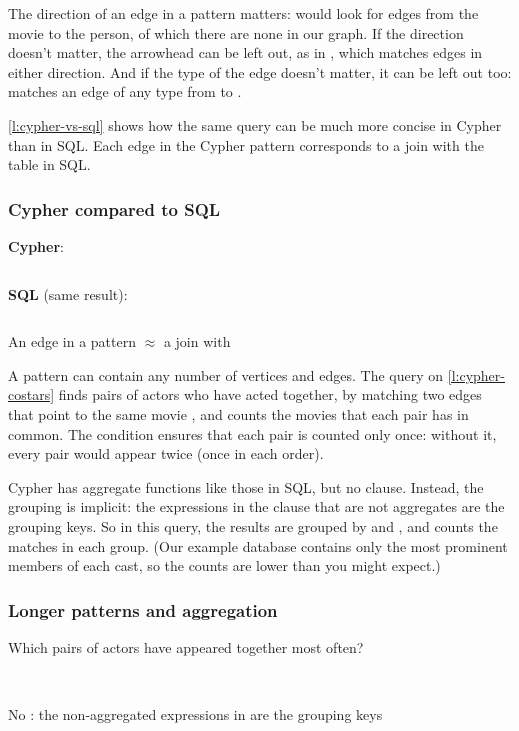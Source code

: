 The direction of an edge in a pattern matters:  would look for edges from the movie to the person, of which there are none in our graph.
If the direction doesn't matter, the arrowhead can be left out, as in , which matches edges in either direction.
And if the type of the edge doesn't matter, it can be left out too:  matches an edge of any type from  to .

\autoref{l:cypher-vs-sql} shows how the same query can be much more concise in Cypher than in SQL.
Each edge in the Cypher pattern corresponds to a join with the  table in SQL.

\begin{frame}
    \label{s:cypher-vs-sql}
    \frametitle{Cypher compared to SQL}
    \textbf{Cypher}:
    \inputminted[fontsize=\footnotesize]{cypher}{code/graph-directed-short.cypher}
    \vspace{0.6em}
    \textbf{SQL} (same result):
    \inputminted[fontsize=\footnotesize]{sql}{code/graph-directed.sql}
    \vspace{0.6em}
    An edge in a pattern $\approx$ a join with 
\end{frame}
\label{l:cypher-vs-sql}

A pattern can contain any number of vertices and edges.
The query on \autoref{l:cypher-costars} finds pairs of actors who have acted together, by matching two  edges that point to the same movie , and counts the movies that each pair has in common.
The  condition  ensures that each pair is counted only once: without it, every pair would appear twice (once in each order).

Cypher has aggregate functions like those in SQL, but no  clause.
Instead, the grouping is implicit: the expressions in the  clause that are not aggregates are the grouping keys.
So in this query, the results are grouped by  and , and  counts the matches in each group.
(Our example database contains only the most prominent members of each cast, so the counts are lower than you might expect.)

\begin{frame}
    \label{s:cypher-costars}
    \frametitle{Longer patterns and aggregation}
    Which pairs of actors have appeared together most often?
    \inputminted[fontsize=\footnotesize]{cypher}{code/graph-costars.cypher}
    \vspace{0.3em}
    {\footnotesize}\\[0.8em]
    No : the non-aggregated expressions in  are the grouping keys
\end{frame}
\label{l:cypher-costars}

